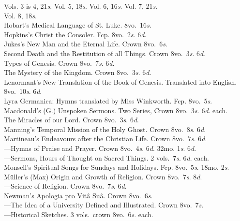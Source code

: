 \documentclass[letterpaper,12pt,oneside,openany]{memoir}
\newcommand{\D}{\hspace*{5mm}}
\newcommand{\E}{\hspace*{2mm}---\hspace*{2mm}}
\begin{document}
\begin{footnotesize}
\D\D Vols. 3 is 4, 21\textit{s}. Vol. 5, 18\textit{s}. Vol. 6, 16\textit{s}. Vol. 7, 21\textit{s}.\\
\D\D Vol. 8, 18\textit{s}.\\
Hobart's Medical Language of St. Luke. 8vo.\ 16\textit{s}.\\
Hopkins's Christ the Consoler. Fcp. 8vo.\ 2\textit{s}. 6\textit{d}.\\
Jukes's New Man and the Eternal Life. Crown 8vo.\ 6\textit{s}.\\
\D Second Death and the Restitution of all Things. Crown 8vo.\ 3\textit{s}. 6\textit{d}.\\
\D Types of Genesis. Crown 8vo.\ 7\textit{s}. 6\textit{d}.\\
\D The Mystery of the Kingdom. Crown 8vo.\ 3\textit{s}. 6\textit{d}.\\
Lenormant's New Translation of the Book of Genesis. Translated into English. 8vo.\ 10\textit{s}. 6\textit{d}.\\
Lyra Germanica: Hymns translated by Miss Winkworth. Fcp. 8vo.\ 5\textit{s}.\\
Macdonald's (G.) Unspoken Sermons. Two Series, Crown 8vo.\ 3\textit{s}. 6\textit{d}. each.\\
\D The Miracles of our Lord. Crown 8vo.\ 3\textit{s}. 6\textit{d}.\\
Manning's Temporal Mission of the Holy Ghost. Crown 8vo.\ 8\textit{s}. 6\textit{d}.\\
Martineau's Endeavours after the Christian Life. Crown 8vo.\ 7\textit{s}. 6\textit{d}.\\
\E Hymns of Praise and Prayer. Crown 8vo.\ 4\textit{s}. 6\textit{d}. 32mo. 1\textit{s}. 6\textit{d}.\\
\E Sermons, Hours of Thought on Sacred Things. 2 vols.\ 7\textit{s}. 6\textit{d}. each.\\
Monsell's Spiritual Songs for Sundays and Holidays. Fcp. 8vo.\ 5\textit{s}. 18mo. 2\textit{s}.\\
M\"uller's (Max) Origin and Growth of Religion. Crown 8vo.\ 7\textit{s}. 8\textit{d}.\\
\E Science of Religion. Crown 8vo.\ 7\textit{s}. 6\textit{d}.\\
Newman's Apologia pro Vit\^a Su\^a. Crown 8vo.\ 6\textit{s}.\\
\E The Idea of a University Defined and Illustrated. Crown 8vo.\ 7\textit{s}.\\
\E Historical Sketches. 3 vols.\ crown 8vo.\ 6\textit{s}. each.\\

\end{footnotesize}
\end{document}
